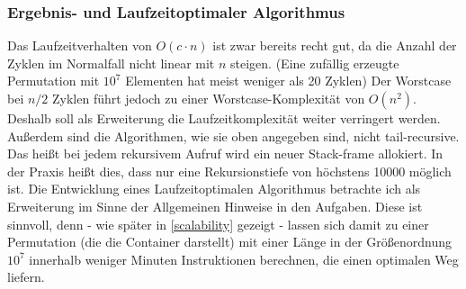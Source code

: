 \subsubsection{Ergebnis- und Laufzeitoptimaler Algorithmus} %
Das Laufzeitverhalten von $O(c \cdot n)$ ist zwar bereits recht gut, da die Anzahl der Zyklen im Normalfall nicht linear mit $n$ steigen.
(Eine zufällig erzeugte Permutation mit $10^7$ Elementen hat meist weniger als 20 Zyklen)%
Der Worstcase bei $n/2$ Zyklen führt jedoch zu einer Worstcase-Komplexität von $O(n^2)$. \\
Deshalb soll als Erweiterung die Laufzeitkomplexität weiter verringert werden. \\
Außerdem sind die Algorithmen, wie sie oben angegeben sind, nicht tail-recursive.
Das heißt bei jedem rekursivem Aufruf wird ein neuer Stack-frame allokiert.
In der Praxis heißt dies, dass nur eine Rekursionstiefe von höchstens 10000 möglich ist.
Die Entwicklung eines Laufzeitoptimalen Algorithmus betrachte ich als Erweiterung im Sinne der Allgemeinen Hinweise in den Aufgaben.
Diese ist sinnvoll, denn - wie später in \ref{scalability} gezeigt -
lassen sich damit zu einer Permutation (die die Container darstellt)
mit einer Länge in der Größenordnung $10^7$ innerhalb weniger Minuten Instruktionen berechnen, die einen optimalen Weg liefern.

